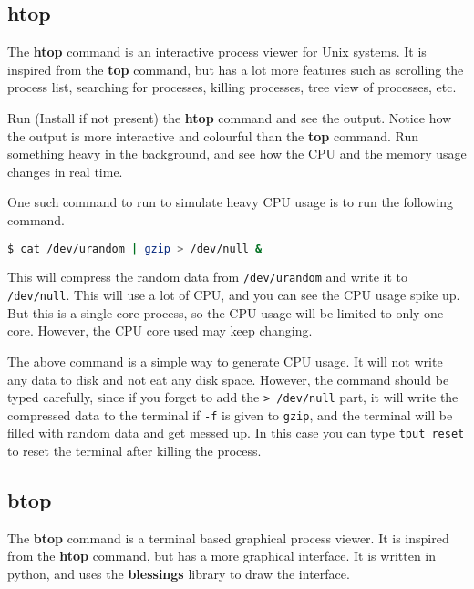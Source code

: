 \subsection{htop}

The \textbf{htop} command is an interactive process viewer for Unix systems.
It is inspired from the \textbf{top} command, but has a lot more features
such as scrolling the process list, searching for processes, killing processes,
tree view of processes, etc.

\begin{exercise}
  Run (Install if not present) the \textbf{htop} command and see the output.
  Notice how the output is more interactive and colourful than the \textbf{top}
  command. Run something heavy in the background, and see how the CPU and
  the memory usage changes in real time.
\end{exercise}

One such command to run to simulate heavy CPU usage is to run the following command.

\begin{lstlisting}[language=bash]
$ cat /dev/urandom | gzip > /dev/null &
\end{lstlisting}

This will compress the random data from \texttt{/dev/urandom} and write it to
\texttt{/dev/null}. This will use a lot of CPU, and you can see the CPU usage
spike up. But this is a single core process, so the CPU usage will be limited
to only one core. However, the CPU core used may keep changing.

\begin{remark}
  The above command is a simple way to generate CPU usage. It will not
  write any data to disk and not eat any disk space. However, the
  command should be typed carefully, since if you forget to add the
  \texttt{> /dev/null} part, it will write the compressed data to the
  terminal if \texttt{-f} is given to \texttt{gzip}, and the terminal
  will be filled with random data and get messed up. In this case
  you can type \texttt{tput reset} to reset the terminal after killing
  the process.
\end{remark}

\subsection{btop}

The \textbf{btop} command is a terminal based graphical process viewer.
It is inspired from the \textbf{htop} command, but has a more graphical
interface. It is written in python, and uses the \textbf{blessings} library
to draw the interface.

